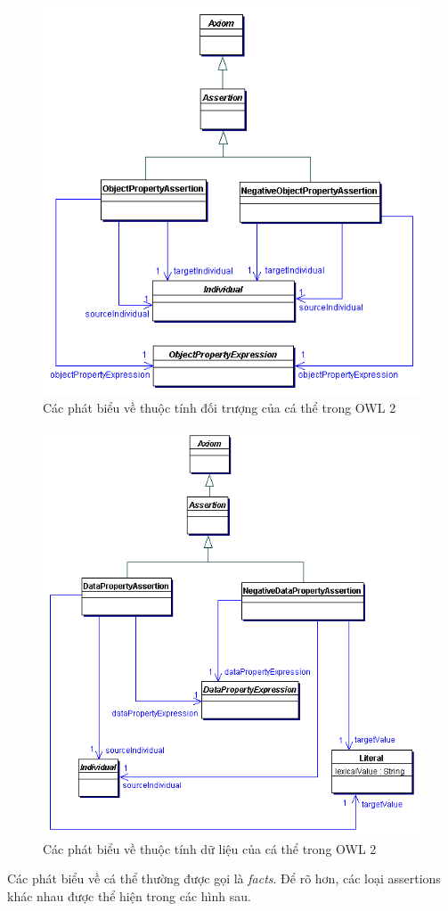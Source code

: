 \begin{figure}
	\centering
	\includegraphics[width=120mm]{Figures/abox2.png}
	\caption{Các phát biểu về thuộc tính đối trượng của cá thể trong OWL 2 \label{overflow}}
\end{figure}

\begin{figure}[h]
	\centering
	\includegraphics[width=120mm]{Figures/abox3.png}
	\caption{Các phát biểu về thuộc tính dữ liệu của cá thể trong OWL 2 \label{overflow}}
\end{figure}
Các phát biểu về cá thể thường được gọi là \textit{facts}. Để rõ hơn, các loại assertions khác nhau được thể hiện trong các hình sau.


